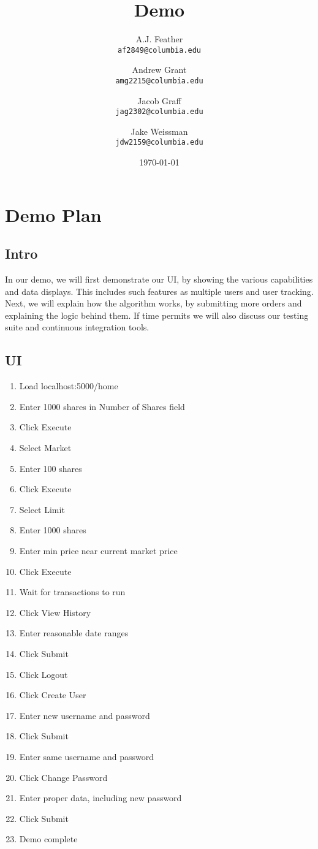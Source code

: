 \documentclass{article}
\title{Demo}
\author{
    A.J. Feather\\
    \texttt{af2849@columbia.edu}
    \and
    Andrew Grant\\
    \texttt{amg2215@columbia.edu}
    \and
    Jacob Graff\\
    \texttt{jag2302@columbia.edu}
    \and
    Jake Weissman\\
    \texttt{jdw2159@columbia.edu}
}
\date{\today}
\begin{document}
\maketitle

\section{Demo Plan}
\subsection{Intro}
In our demo, we will first demonstrate our UI, by showing the various capabilities and data displays. This includes such features as multiple users and user tracking. Next, we will explain how the algorithm works, by submitting more orders and explaining the logic behind them. If time permits we will also discuss our testing suite and continuous integration tools.
\subsection{UI}
\begin{enumerate}
\item Load localhost:5000/home
\item Enter 1000 shares in Number of Shares field
\item Click Execute
\item Select Market
\item Enter 100 shares
\item Click Execute
\item Select Limit
\item Enter 1000 shares
\item Enter min price near current market price
\item Click Execute
\item Wait for transactions to run
\item Click View History
\item Enter reasonable date ranges
\item Click Submit
\item Click Logout
\item Click Create User
\item Enter new username and password
\item Click Submit
\item Enter same username and password
\item Click Change Password
\item Enter proper data, including new password
\item Click Submit
\item Demo complete
\end{enumerate}
\end{document}
